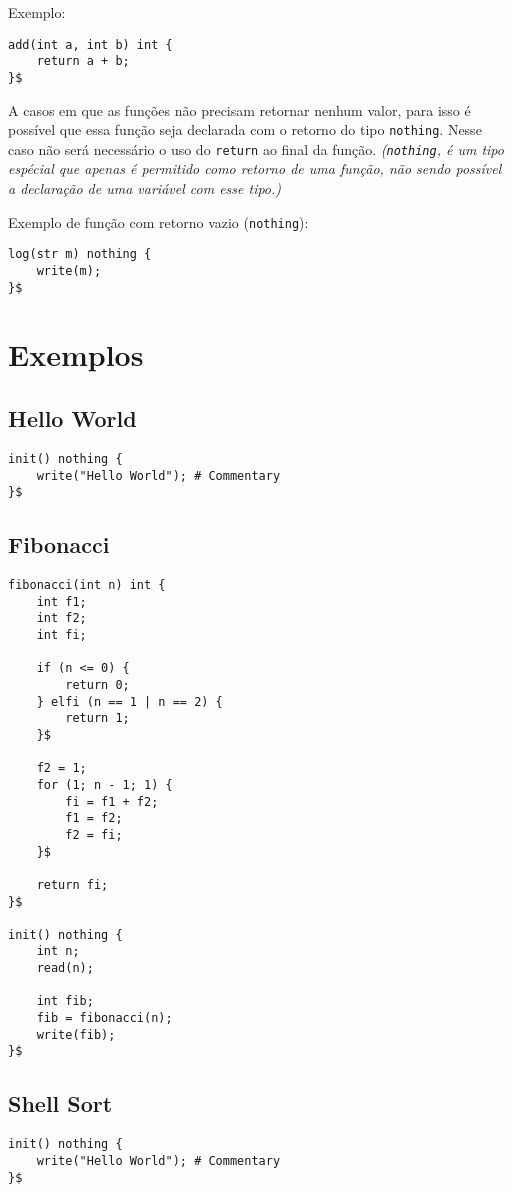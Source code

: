 \documentclass[a4paper,11pt]{article}
\begin{document}
Exemplo:
\begin{lstlisting}
add(int a, int b) int {
    return a + b;
}$
\end{lstlisting}

A casos em que as funções não precisam retornar nenhum valor, para isso é possível que essa função
seja declarada com o retorno do tipo \texttt{nothing}. Nesse caso não será necessário o uso do
\texttt{return} ao final da função. \textit{(\texttt{nothing}, é um tipo espécial que apenas é
permitido como retorno de uma função, não sendo possível a declaração de uma variável com esse tipo.)}

Exemplo de função com retorno vazio (\texttt{nothing}):
\begin{lstlisting}
log(str m) nothing {
    write(m);
}$
\end{lstlisting}

\section{Exemplos}

\subsection{Hello World}
\begin{lstlisting}
init() nothing {
    write("Hello World"); # Commentary
}$
\end{lstlisting}

\pagebreak

\subsection{Fibonacci}
\begin{lstlisting}
fibonacci(int n) int {
    int f1;
    int f2;
    int fi;

    if (n <= 0) {
        return 0;
    } elfi (n == 1 | n == 2) {
        return 1;
    }$

    f2 = 1;
    for (1; n - 1; 1) {
        fi = f1 + f2;
        f1 = f2;
        f2 = fi;
    }$

    return fi;
}$

init() nothing {
    int n;
    read(n);
    
    int fib;
    fib = fibonacci(n);
    write(fib);
}$
\end{lstlisting}

\pagebreak

\subsection{Shell Sort}
\begin{lstlisting}
init() nothing {
    write("Hello World"); # Commentary
}$
\end{lstlisting}
\end{document}
